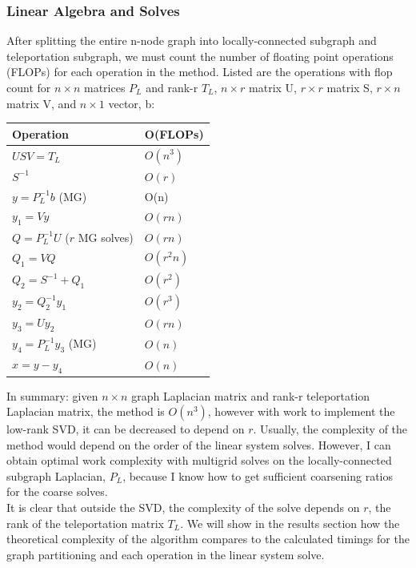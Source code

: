 \documentclass{article}
\begin{document}
\subsubsection{Linear Algebra and Solves}
After splitting the entire n-node graph into locally-connected subgraph and teleportation subgraph, we must count the number of floating point operations (FLOPs) for each operation in the method. Listed are the operations with flop count for $n\times n$ matrices $P_L$ and rank-r $T_L$, $n\times r$ matrix U, $r\times r$ matrix S, $r\times n$ matrix V, and $n\times 1$ vector, b:\\
\begin{spacing}{1}
\begin{center}
\renewcommand{\arraystretch}{1.5}
    \begin{tabular}{ | l | l |}
    \hline
    \textbf{Operation} & \textbf{O(FLOPs)} \\ \hline
    $USV = T_L$ & $O(n^3)$ \\ \hline
    $S^{-1}$ & $O(r)$ \\ \hline
    $y = P_L^{-1}b$ (MG) & O(n)  \\  \hline
    $y_1 = Vy$ & $O(rn)$ \\ \hline
    $Q = P_L^{-1}U$ ($r$ MG solves) & $O(rn)$ \\ \hline
    $Q_1 = VQ$ & $O(r^2 n)$ \\ \hline
    $Q_2 = S^{-1} + Q_1$ & $O(r^2)$ \\ \hline
    $y_2 = Q_2^{-1}y_1$ & $O(r^3)$ \\ \hline
    $y_3 = Uy_2$ & $O(rn)$ \\ \hline
    $y_4 = P_L^{-1}y_3$ (MG) & $O(n)$ \\ \hline
    $x = y - y_4$ & $O(n)$ \\
    \hline
    \end{tabular}
\end{center}
\end{spacing}
\vspace{.2in}
In summary: given $n\times n$ graph Laplacian matrix and rank-r teleportation Laplacian matrix, the method is $O(n^3)$, however with work to implement the low-rank SVD, it can be decreased to depend on $r$. Usually, the complexity of the method would depend on the order of the linear system solves. However, I can obtain optimal work complexity with multigrid solves on the locally-connected subgraph Laplacian, $P_L$, because I know how to get sufficient coarsening ratios for the coarse solves.\\
It is clear that outside the SVD, the complexity of the solve depends on $r$, the rank of the teleportation matrix $T_L$. We will show in the results section how the theoretical complexity of the algorithm compares to the calculated timings for the graph partitioning and each operation in the linear system solve.





%
%
\end{document}
